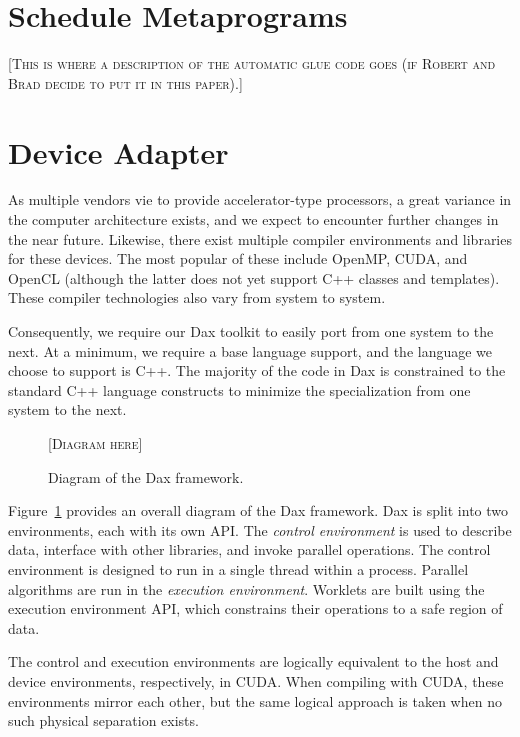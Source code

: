 \documentclass[conference]{IEEEtran}
\newcommand*{\keyterm}[1]{\emph{#1}}
\newcommand{\fix}[1]{{\color{red}\textsc{[#1]}}}
\begin{document}
\section{Schedule Metaprograms}
\label{sec:ScheduleMetaprograms}

\noindent
\fix{This is where a description of the automatic glue code goes (if Robert
  and Brad decide to put it in this paper).}

\section{Device Adapter}
\label{sec:DeviceAdapter}

\noindent
As multiple vendors vie to provide accelerator-type processors, a great
variance in the computer architecture exists, and we expect to encounter
further changes in the near future.  Likewise, there exist multiple
compiler environments and libraries for these devices.  The most popular of
these include OpenMP, CUDA, and OpenCL (although the latter does not yet
support C++ classes and templates).  These compiler technologies also vary
from system to system.

Consequently, we require our Dax toolkit to easily port from one system to
the next.  At a minimum, we require a base language support, and the
language we choose to support is C++.  The majority of the code in Dax is
constrained to the standard C++ language constructs to minimize the
specialization from one system to the next.

\begin{figure}[htb]
  \centering
  \fix{Diagram here}
  \caption{Diagram of the Dax framework.}
  \label{fig:DaxDiagram}
\end{figure}

Figure~\ref{fig:DaxDiagram} provides an overall diagram of the Dax
framework.  Dax is split into two environments, each with its own API.  The
\keyterm{control environment} is used to describe data, interface with
other libraries, and invoke parallel operations.  The control environment
is designed to run in a single thread within a process.  Parallel
algorithms are run in the \keyterm{execution environment}.  Worklets are
built using the execution environment API, which constrains their
operations to a safe region of data.

The control and execution environments are logically equivalent to the host
and device environments, respectively, in CUDA.  When compiling with CUDA,
these environments mirror each other, but the same logical approach is
taken when no such physical separation exists.
\end{document}
